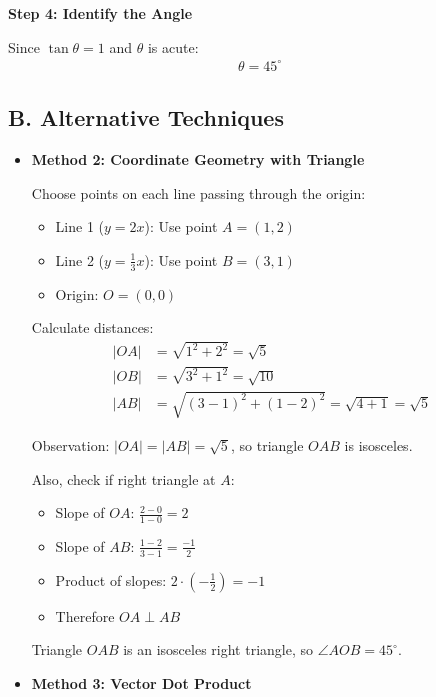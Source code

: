 \documentclass[12pt]{article}
\begin{document}
\begin{techniquesbox}
\begin{itemize}[leftmargin=*]
    \textbf{Step 4: Identify the Angle}
    
    Since $\tan\theta = 1$ and $\theta$ is acute:
    \begin{align*}
    \theta = 45^\circ
    \end{align*}
\end{itemize}

\subsection*{B. Alternative Techniques}
\begin{itemize}[leftmargin=*]
    \item \textbf{Method 2: Coordinate Geometry with Triangle}
    
    Choose points on each line passing through the origin:
    \begin{itemize}
        \item Line 1 ($y = 2x$): Use point $A = (1, 2)$
        \item Line 2 ($y = \frac{1}{3}x$): Use point $B = (3, 1)$
        \item Origin: $O = (0, 0)$
    \end{itemize}
    
    Calculate distances:
    \begin{align*}
    |OA| &= \sqrt{1^2 + 2^2} = \sqrt{5}\\
    |OB| &= \sqrt{3^2 + 1^2} = \sqrt{10}\\
    |AB| &= \sqrt{(3-1)^2 + (1-2)^2} = \sqrt{4 + 1} = \sqrt{5}
    \end{align*}
    
    Observation: $|OA| = |AB| = \sqrt{5}$, so triangle $OAB$ is isosceles.
    
    Also, check if right triangle at $A$:
    \begin{itemize}
        \item Slope of $OA$: $\frac{2-0}{1-0} = 2$
        \item Slope of $AB$: $\frac{1-2}{3-1} = \frac{-1}{2}$
        \item Product of slopes: $2 \cdot \left(-\frac{1}{2}\right) = -1$
        \item Therefore $OA \perp AB$
    \end{itemize}
    
    Triangle $OAB$ is an isosceles right triangle, so $\angle AOB = 45^\circ$.
    
    \item \textbf{Method 3: Vector Dot Product}
    

\end{itemize}
\end{techniquesbox}
\end{document}
